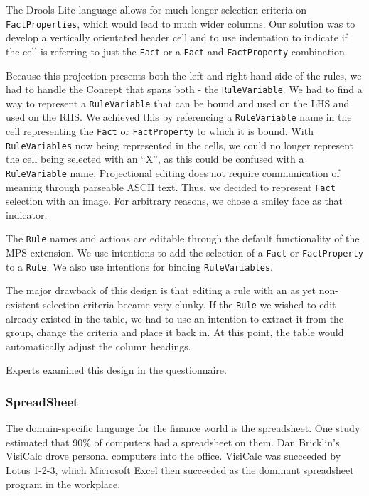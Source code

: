 The Drools-Lite language allows for much longer selection criteria on \texttt{FactProperties}, which would lead to much wider columns.
Our solution was to develop a vertically orientated header cell and to use indentation to indicate if the cell is referring to just the \texttt{Fact} or a \texttt{Fact} and \texttt{FactProperty} combination.

Because this projection presents both the left and right-hand side of the rules, we had to handle the Concept that spans both - the \texttt{RuleVariable}.
We had to find a way to represent a \texttt{RuleVariable} that can be bound and used on the LHS and used on the RHS.
We achieved this by referencing a \texttt{RuleVariable} name in the cell representing the \texttt{Fact} or \texttt{FactProperty} to which it is bound.
With \texttt{RuleVariables} now being represented in the cells, we could no longer represent the cell being selected with an ``X'', as this could be confused with a \texttt{RuleVariable} name.
Projectional editing does not require communication of meaning through parseable ASCII text.
Thus, we decided to represent \texttt{Fact} selection with an image.
For arbitrary reasons, we chose a smiley face as that indicator.

The \texttt{Rule} names and actions are editable through the default functionality of the MPS extension.
We use intentions to add the selection of a \texttt{Fact} or \texttt{FactProperty} to a \texttt{Rule}.
We also use intentions for binding \texttt{RuleVariables}.

The major drawback of this design is that editing a rule with an as yet non-existent selection criteria became very clunky.
If the \texttt{Rule} we wished to edit already existed in the table, we had to use an intention to extract it from the group, change the criteria and place it back in.
At this point, the table would automatically adjust the column headings.

Experts examined this design in the questionnaire.

\subsubsection{SpreadSheet}

The domain-specific language for the finance world is the spreadsheet.
One study estimated that 90\% of computers had a spreadsheet on them\cite{bradley2009using}.
Dan Bricklin's VisiCalc drove personal computers into the office.
VisiCalc was succeeded by Lotus 1-2-3, which Microsoft Excel then succeeded as the dominant spreadsheet program in the workplace.

